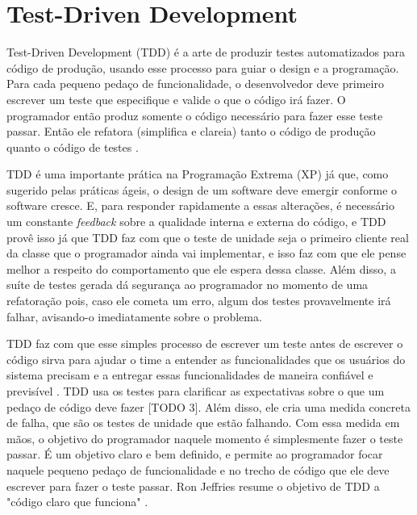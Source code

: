 \chapter{Test-Driven Development}
\label{cap:tdd}

Test-Driven Development (TDD) é a arte de produzir testes automatizados para código de produção, usando
esse processo para guiar o design e a programação. Para cada pequeno pedaço de funcionalidade, o desenvolvedor
deve primeiro escrever um teste que especifique e valide o que o código irá fazer. O programador então produz
somente o código necessário para fazer esse teste passar. Então ele refatora (simplifica e clareia) tanto o
código de produção quanto o código de testes \cite{agilealliance-tdd} \cite{tdd-taxonomy}.

TDD é uma importante prática na Programação Extrema (XP) \cite{XPExplained} já que, como sugerido pelas práticas
ágeis, o design de um software deve emergir conforme o software cresce. E, para responder rapidamente a essas
alterações, é necessário um constante \textit{feedback} sobre a qualidade interna e externa do código, e TDD
provê isso já que TDD faz com que o teste de unidade seja o primeiro cliente real da classe que o programador ainda
vai implementar, e isso faz com que ele pense melhor a respeito do comportamento que ele espera dessa classe. Além disso,
a suíte de testes gerada dá segurança ao programador no momento de uma refatoração pois, caso ele cometa um erro,
algum dos testes provavelmente irá falhar, avisando-o imediatamente sobre o problema.

TDD faz com que esse simples processo de escrever um teste antes de escrever o código
sirva para ajudar o time a entender as funcionalidades que os usuários do sistema precisam e 
a entregar essas funcionalidades de maneira confiável e previsível \cite{GOOS}. TDD usa os testes para clarificar as expectativas
sobre o que um pedaço de código deve fazer [TODO 3]. Além disso, ele cria uma medida concreta de falha, que são os testes de 
unidade que estão falhando. Com essa medida em mãos, o objetivo do programador naquele momento é simplesmente fazer o teste passar. É um
objetivo claro e bem definido, e permite ao programador focar naquele pequeno pedaço de funcionalidade e no trecho de código que ele 
deve escrever para fazer o teste passar. Ron Jeffries resume o objetivo de TDD a "código claro que funciona" \cite{TDDByExample}. 

